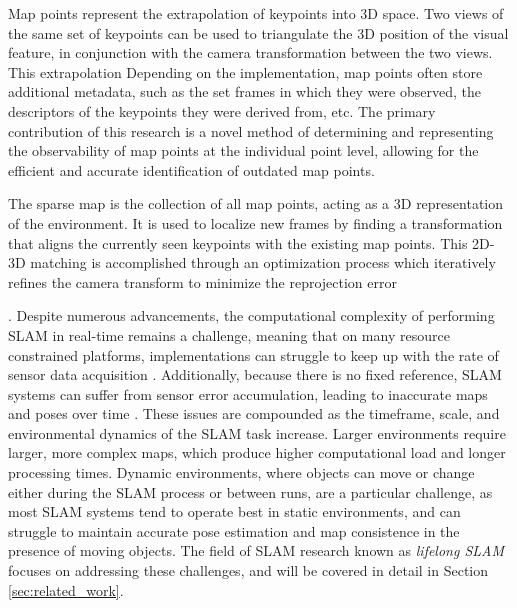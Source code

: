 Map points represent the extrapolation of keypoints into 3D space. Two views of the same set of keypoints can be used to triangulate the 3D position of the visual feature, in conjunction with the camera transformation between the two views. This extrapolation Depending on the implementation, map points often store additional metadata, such as the set frames in which they were observed, the descriptors of the keypoints they were derived from, etc. The primary contribution of this research is a novel method of determining and representing the observability of map points at the individual point level, allowing for the efficient and accurate identification of outdated map points.

The sparse map is the collection of all map points, acting as a 3D representation of the environment. It is used to localize new frames by finding a transformation that aligns the currently seen keypoints with the existing map points. This 2D-3D matching is accomplished through an optimization process which iteratively refines the camera transform to minimize the reprojection error

. Despite numerous advancements, the computational complexity of performing SLAM in real-time remains a challenge, meaning that on many resource constrained platforms, implementations can struggle to keep up with the rate of sensor data acquisition \cite{semenovaQuantitativeAnalysisSystem2022}. Additionally, because there is no fixed reference, SLAM systems can suffer from sensor error accumulation, leading to inaccurate maps and poses over time \cite{cadenaPresentFutureSimultaneous2016}. These issues are compounded as the timeframe, scale, and environmental dynamics of the SLAM task increase. Larger environments require larger, more complex maps, which produce higher computational load and longer processing times. Dynamic environments, where objects can move or change either during the SLAM process or between runs, are a particular challenge, as most SLAM systems tend to operate best in static environments, and can struggle to maintain accurate pose estimation and map consistence in the presence of moving objects. The field of SLAM research known as \textit{lifelong SLAM} \cite{cadenaPresentFutureSimultaneous2016} focuses on addressing these challenges, and will be covered in detail in Section \ref{sec:related_work}.
